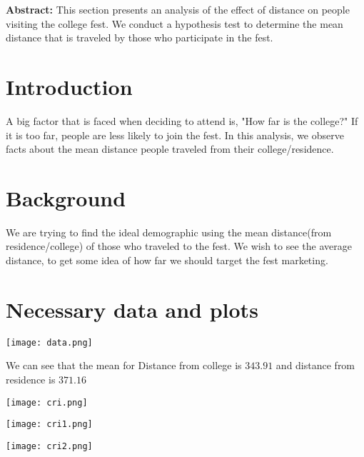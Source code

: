 \documentclass[oneside]{book}
\begin{document}
\textbf{\Large Abstract:}
\large This section presents an analysis of the effect of distance on people visiting the college fest. We conduct a hypothesis test to determine the mean distance that is traveled by those who participate in the fest. 

\section{Introduction}
\large A big factor that is faced when deciding to attend is, "How far is the college?" If it is too far, people are less likely to join the fest. In this analysis, we observe facts about the mean distance people traveled from their college/residence.

\section{Background}
\large We are trying to find the ideal demographic using the mean distance(from residence/college) of those who traveled to the fest. We wish to see the average distance, to get some idea of how far we should target the fest marketing.

\section{Necessary data and plots}
\begin{minipage}{\textwidth}
    \centering
    \texttt{[image: data.png]}
    \label{fig:enter-label}
\end{minipage}

\bigskip
\large We can see that the mean for Distance from college is $343.91$ and distance from residence is $371.16$ 
\bigskip

\begin{minipage}{\textwidth}
    \centering
    \texttt{[image: cri.png]}
    \label{fig:enter-label}
\end{minipage}

\begin{minipage}{\textwidth}
    \centering
    \texttt{[image: cri1.png]}
    \label{fig:enter-label}
\end{minipage}

\begin{minipage}{\textwidth}
    \centering
    \texttt{[image: cri2.png]}
    \label{fig:enter-label}
\end{minipage}
\end{document}
